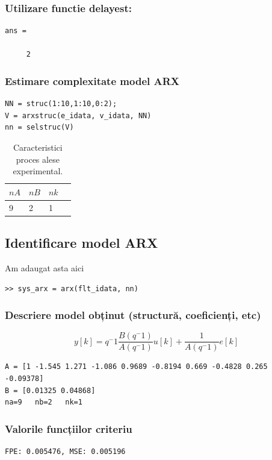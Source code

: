 \documentclass[12pt,english]{article}
\begin{document}
\subsubsection {Utilizare functie delayest: }
\begin{lstlisting}
ans =

     2
\end{lstlisting}

\subsubsection {Estimare complexitate model ARX }
\begin{lstlisting}
NN = struc(1:10,1:10,0:2);
V = arxstruc(e_idata, v_idata, NN)
nn = selstruc(V)
\end{lstlisting}

\begin{table}[H]
  \centering
    \begin{tabular}{|l|l|l|l|}
      \hline
      $nA$ & $nB$ & $nk$ \\
      \hline
      9 & 2 & 1 \\
      \hline
    \end{tabular}
    \caption{Caracteristici proces alese experimental.}
\end{table}

\subsection {Identificare model ARX }
Am adaugat asta aici 
\begin{lstlisting}
>> sys_arx = arx(flt_idata, nn)
\end{lstlisting}

\subsubsection {Descriere model obținut (structură, coeficienți, etc) }
\[ y[k] = q^-1 \dfrac{B(q^-1)}{A(q^-1)}u[k] + \dfrac{1}{A(q^-1)}e[k] \]

\begin{lstlisting}
A = [1 -1.545 1.271 -1.086 0.9689 -0.8194 0.669 -0.4828 0.265 -0.09378]
B = [0.01325 0.04868]
na=9   nb=2   nk=1
\end{lstlisting}
\subsubsection {Valorile funcțiilor criteriu }
\begin{lstlisting}
FPE: 0.005476, MSE: 0.005196
\end{lstlisting}
\end{document}
